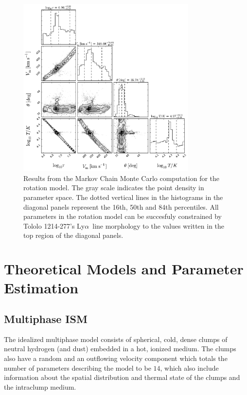 \documentclass[a4,useAMS,usenatbib,usegraphicx]{mn2e}
\newcommand{\tol}{Tololo 1214-277}
\newcommand{\lya}{Ly$\alpha$}
\begin{document}
\begin{figure}
\begin{center}
\includegraphics[width=0.8\textwidth]{emcee_results.pdf}
\caption{Results from the Markov Chain Monte Carlo computation for
    the rotation model. 
    The gray scale indicates the point density in parameter space. 
    The dotted vertical lines in the histograms in the diagonal panels
    represent the 16th, 50th and 84th percentiles. 
    All parameters in the rotation model can be succesfuly constrained by \tol's
    \lya\ line morphology to the values written in the top region of
    the diagonal panels.
    \label{emceeresults}} 
\end{center}
\end{figure}


\section{Theoretical Models and Parameter Estimation}


\subsection{Multiphase ISM} 

The idealized multiphase model consists of spherical, cold, dense
clumps of neutral hydrogen (and dust) embedded in a hot, ionized
medium. 
The clumps also have a random and an outflowing velocity
component which totals the number of parameters describing the model
to be $14$, which also include information about the spatial
distribution and thermal state of the clumps and the intraclump
medium. 
\end{document}
